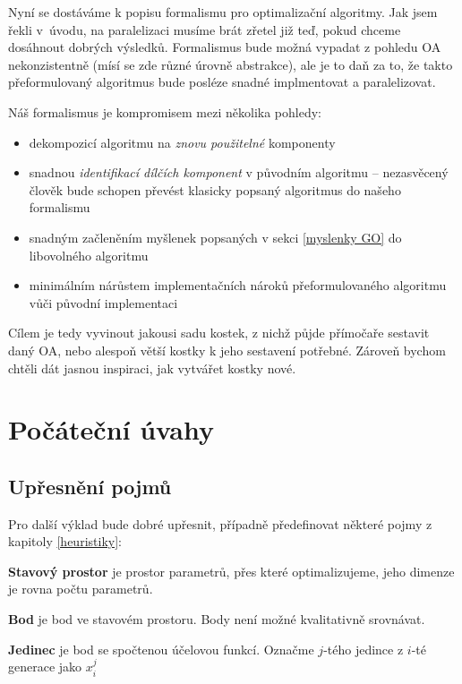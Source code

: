 
Nyní se dostáváme k popisu formalismu pro optimalizační algoritmy. Jak jsem řekli v~úvodu, na paralelizaci musíme brát zřetel již teď, pokud chceme dosáhnout dobrých výsledků. Formalismus bude možná vypadat z pohledu OA nekonzistentně (mísí se zde různé úrovně abstrakce), ale je to daň za to, že takto přeformulovaný algoritmus bude posléze snadné implmentovat a paralelizovat.

Náš formalismus je kompromisem mezi několika pohledy:
\begin{itemize}
  \item dekompozicí algoritmu na \emph{znovu použitelné} komponenty
  \item snadnou \emph{identifikací dílčích komponent} v původním algoritmu -- nezasvěcený člověk bude schopen převést klasicky popsaný algoritmus do našeho formalismu
  \item snadným začleněním myšlenek popsaných v sekci \ref{myslenky GO} do libovolného algoritmu
  \item minimálním nárůstem implementačních nároků přeformulovaného algoritmu vůči původní implementaci
\end{itemize}

Cílem je tedy vyvinout jakousi sadu kostek, z nichž půjde přímočaře sestavit daný OA, nebo alespoň větší kostky k jeho sestavení potřebné. Zároveň bychom chtěli dát jasnou inspiraci, jak vytvářet kostky nové.

\section{Počáteční úvahy}
\subsection{Upřesnění pojmů}
Pro další výklad bude dobré upřesnit, případně předefinovat některé pojmy z kapitoly \ref{heuristiky}:

\par{\textbf{Stavový prostor} je prostor parametrů, přes které optimalizujeme, jeho dimenze je rovna počtu parametrů.}

\par{\textbf{Bod} je bod ve stavovém prostoru. Body není možné kvalitativně srovnávat.}

\par{\textbf{Jedinec} je bod se spočtenou účelovou funkcí. Označme $j$-tého jedince z $i$-té generace jako $x^j_i$}

